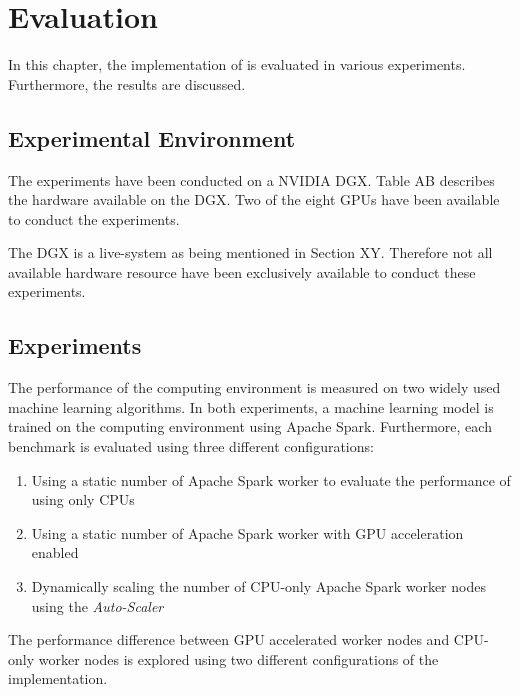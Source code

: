 \chapter{Evaluation}
\label{chap:07_evaluation}

In this chapter, the implementation of  is evaluated in various experiments. Furthermore, the results are discussed.

\section{Experimental Environment}
The experiments have been conducted on a NVIDIA DGX.
Table AB describes the hardware available on the DGX.
Two of the eight GPUs have been available to conduct the experiments.


The DGX is a live-system as being mentioned in Section XY. Therefore not all available hardware resource have been exclusively available to conduct these experiments.


\section{Experiments}
The performance of the computing environment is measured on two widely used machine learning algorithms.
In both experiments, a machine learning model is trained on the computing environment using Apache Spark. Furthermore, each benchmark is evaluated using three different configurations:
\begin{enumerate}
\item Using a static number of Apache Spark worker to evaluate the performance of using only CPUs 
\item Using a static number of Apache Spark worker with GPU acceleration enabled
\item Dynamically scaling the number of CPU-only Apache Spark worker nodes using the \textit{Auto-Scaler}
\end{enumerate}
The performance difference between GPU accelerated worker nodes and CPU-only worker nodes is explored using two different configurations of the implementation.


